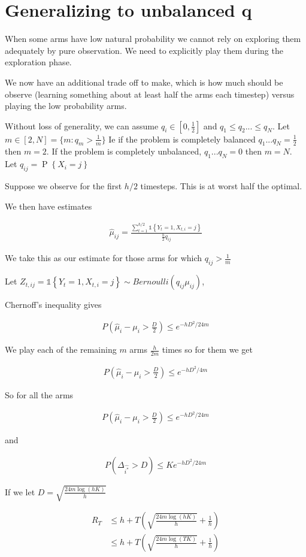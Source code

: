 \documentclass{article}
\newcommand{\set}[1]{\left\{#1\right\}}
\newcommand{\ind}[1]{\mathds{1}\!\!\set{#1}}
\newcommand{\eqn}[1]{\begin{align}#1\end{align}}
\renewcommand{\P}[1]{\operatorname{P}\left\{#1\right\}}
\theoremstyle{plain}
\theoremstyle{definition}
\begin{document}
\section{Generalizing to unbalanced $\boldsymbol{q}$}

When some arms have low natural probability we cannot rely on exploring them adequately by pure observation. We need to explicitly play them during the exploration phase. 

We now have an additional trade off to make, which is how much should be observe (learning something about at least half the arms each timestep) versus playing the low probability arms. 

Without loss of generality, we can assume $q_i \in [0,\frac{1}{2}]$ and $q_1 \leq q_2 ... \leq q_N$. Let $m \in [2,N] = \{m:q_m > \frac{1}{m}\}$ Ie if the problem is completely balanced $q_1...q_N = \frac{1}{2}$ then $m = 2$. If the problem is completely unbalanced, $q_1...q_N = 0$ then $m=N$. Let $q_{ij} = \P{X_i = j}$

Suppose we observe for the first $h/2$ timesteps. This is at worst half the optimal. 

We then have estimates 

\eqn {
\hat{\mu}_{ij} = \frac{\sum_{t=1}^{h/2}\ind{Y_t=1,X_{t,i}=j}}{\frac{h}{2}q_{ij}}
}

We take this as our estimate for those arms for which $q_{ij} > \frac{1}{m}$

Let $Z_{t,ij} = \ind{Y_t=1,X_{t,i}=j} \sim Bernoulli(q_{ij}\mu_{ij})$, 

Chernoff's inequality gives

\eqn{
P(\hat{\mu}_i - \mu_{i} > \frac{D}{2}) \leq e^{-hD^2/24m}
}

We play each of the remaining $m$ arms $\frac{h}{2m}$ times so for them we get

\eqn{
P(\hat{\mu}_i - \mu_{i} > \frac{D}{2}) \leq e^{-hD^2/4m}
}

So for all the arms 

\eqn{
P(\hat{\mu}_i - \mu_{i} > \frac{D}{2}) \leq e^{-hD^2/24m}
}

and 



\eqn{
\label{eqn:unbalancedHoeffdings}
P(\Delta_{\hat{i^*}} > D) \leq Ke^{-hD^2/24m}
}

If we let $D = \sqrt{\frac{24m\log(hK)}{h}}$

\eqn{
R_T &  \leq h + T\left(\sqrt{\frac{24m\log(hK)}{h}} + \frac{1}{h}\right) \\
& \leq h + T\left(\sqrt{\frac{24m\log(TK)}{h}} + \frac{1}{h}\right) 
}
\end{document}

